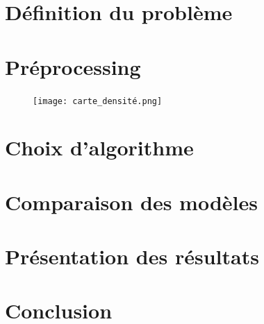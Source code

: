 \documentclass{article}
\begin{document}
    \section{Définition du problème}

    \section{Préprocessing}
    \begin{figure}[H]
            \centering
	    \texttt{[image: carte\_densité.png]}
    \end{figure}

    \section{Choix d'algorithme}

    \section{Comparaison des modèles}

    \section{Présentation des résultats}

    \section{Conclusion}
\end{document}
